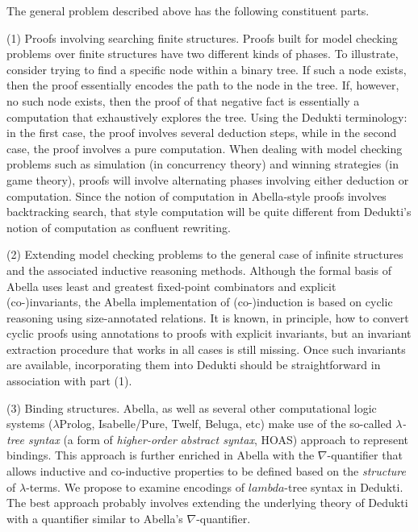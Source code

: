 \begin{workpackage}[id=theories,wphases=0-48,type=RTD,
  short=Theories in Dedukti,%
  title= Defining theories in Dedukti,
  lead=Inn,
  InnRM=10]
\begin{tasklist}
\begin{task}[id=abella,title=Express the theory of Abella in Dedukti and instrument the system]
The general problem described above has the following constituent parts.

(1) Proofs involving searching finite structures. Proofs built for
model checking problems over finite structures have two different
kinds of phases.  To illustrate, consider trying to find a specific
node within a binary tree.  If such a node exists, then the proof
essentially encodes the path to the node in the tree.  If, however, no
such node exists, then the proof of that negative fact is essentially
a computation that exhaustively explores the tree.  Using the Dedukti
terminology: in the first case, the proof involves several deduction
steps, while in the second case, the proof involves a pure
computation. When dealing with model checking problems such as
simulation (in concurrency theory) and winning strategies (in game
theory), proofs will involve alternating phases involving either
deduction or computation.  Since the notion of computation in
Abella-style proofs involves backtracking search, that style
computation will be quite different from Dedukti's notion of
computation as confluent rewriting.

(2) Extending model checking problems to the general case of infinite
structures and the associated inductive reasoning methods. Although
the formal basis of Abella uses least and greatest fixed-point
combinators and explicit (co-)invariants, the Abella implementation of
(co-)induction is based on cyclic reasoning using size-annotated
relations. It is known, in principle, how to convert cyclic proofs
using annotations to proofs with explicit invariants, but an invariant
extraction procedure that works in all cases is still missing. Once
such invariants are available, incorporating them into Dedukti should
be straightforward in association with part (1).

(3) Binding structures. Abella, as well as several other computational
logic systems ($\lambda$Prolog, Isabelle/Pure, Twelf, Beluga, etc)
make use of the so-called \emph{$\lambda$-tree syntax} (a form of
\emph{higher-order abstract syntax}, HOAS) approach to represent
bindings. This approach is further enriched in Abella with the
$\nabla$-quantifier that allows inductive and co-inductive properties
to be defined based on the \emph{structure} of $\lambda$-terms. We
propose to examine encodings of $lambda$-tree syntax in Dedukti. The
best approach probably involves extending the underlying theory of
Dedukti with a quantifier similar to Abella's $\nabla$-quantifier.


\end{task}
\end{tasklist}
\end{workpackage}
